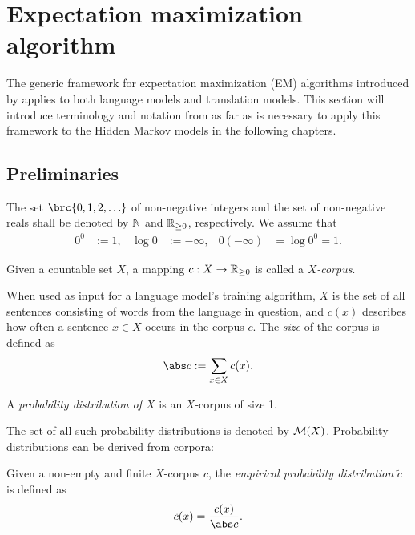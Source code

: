 \chapter{Expectation maximization algorithm}

The generic framework for expectation maximization (EM) algorithms introduced
by \cite{bucstuvog15} applies to both language models and translation models.
This section will introduce terminology and notation from \cite{bucstuvog15} as
far as is necessary to apply this framework to the Hidden Markov models in the
following chapters.

\section{Preliminaries}

The set $\brc{0,1,2,\ldots}$ of non-negative integers and the set of non-negative reals shall be denoted by $\mathbb N$ and $\mathbb R_{\geq0}$, respectively. We assume that
\begin{align*}
 0^0 &:= 1, &
 \log 0 &:= -\infty, &
 0 (-\infty) &= \log 0^0 = 1.
\end{align*}

\begin{definition}
 Given a countable set $X$, a mapping $c: X \to \mathbb R_{\geq0}$ is called a \emph{$X$-corpus}.
\end{definition}

When used as input for a language model's training algorithm, $X$ is the set of all sentences consisting of words from the language in question, and $c(x)$ describes how often a sentence $x\in X$ occurs in the corpus $c$. The \emph{size} of the corpus is defined as
\begin{equation*}
 \abs c := \sum_{x\in X} c(x).
\end{equation*}

\begin{definition}
 A \emph{probability distribution of $X$} is an $X$-corpus of size 1.
\end{definition}

The set of all such probability distributions is denoted by $\mathcal M(X)$. Probability distributions can be derived from corpora:

\begin{definition}
 Given a non-empty and finite $X$-corpus $c$, the \emph{empirical probability distribution} $\tilde c$ is defined as
 \[
  \tilde c(x) = \frac{c(x)}{\abs c}.
 \]
\end{definition}

